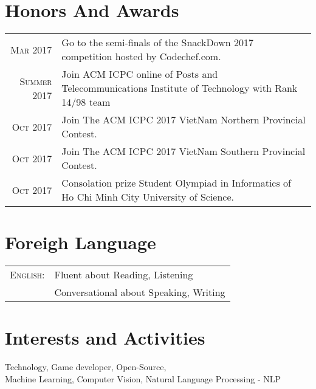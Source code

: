 \documentclass[a4paper,10pt]{article}
\begin{document}
\section{Honors And Awards}
\begin{tabular}{rl}
 \textsc{Mar} 2017 & Go to the semi-finals of the SnackDown 2017 competition hosted by Codechef.com.\\
\textsc{Summer} 2017 & Join ACM ICPC online of Posts and Telecommunications Institute of Technology with Rank 14/98 team\\
\textsc{Oct} 2017 & Join The ACM ICPC 2017 VietNam Northern Provincial Contest.\\
\textsc{Oct} 2017 & Join The ACM ICPC 2017 VietNam Southern Provincial Contest.\\
\textsc{Oct} 2017 & Consolation prize Student Olympiad in Informatics of Ho Chi Minh City University of Science.\\

\end{tabular}

\section{Foreigh Language}
\begin{tabular}{rl}
\textsc{English:}&Fluent about Reading, Listening\\
& Conversational about Speaking, Writing
\end{tabular}

\section{Interests and Activities}
Technology, Game developer, Open-Source,\\
Machine Learning, Computer Vision, Natural Language Processing - NLP\\
\end{document}
